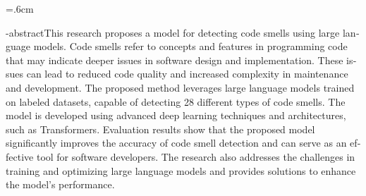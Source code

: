 
\baselineskip=.6cm
\begin{latin}
    \en-abstract{This research proposes a model for detecting code smells using large language models. Code smells refer to concepts and features in programming code that may indicate deeper issues in software design and implementation. These issues can lead to reduced code quality and increased complexity in maintenance and development. The proposed method leverages large language models trained on labeled datasets, capable of detecting 28 different types of code smells. The model is developed using advanced deep learning techniques and architectures, such as Transformers. Evaluation results show that the proposed model significantly improves the accuracy of code smell detection and can serve as an effective tool for software developers. The research also addresses the challenges in training and optimizing large language models and provides solutions to enhance the model's performance.}
    \latinfirstPage
\end{latin}
